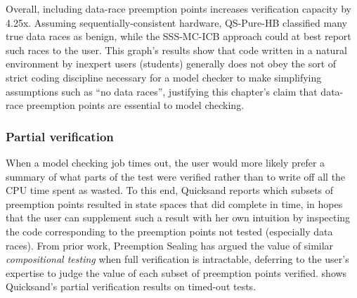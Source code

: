 Overall, including data-race preemption points increases verification capacity by 4.25x.
Assuming sequentially-consistent hardware,
QS-Pure-HB classified many true data races as benign,
while the SSS-MC-ICB approach could at best report such races to the user.
This graph's results show that code written in a natural environment by inexpert users (students)
generally does not obey the sort of strict coding discipline necessary
for a model checker to make simplifying assumptions such as ``no data races'',
justifying this chapter's claim that data-race preemption points are essential to model checking.

\subsubsection{Partial verification}
\label{sec:quicksand-eval-partial}

When a model checking job times out,
the user would more likely prefer a summary of what parts of the test were verified
rather than to write off all the CPU time spent as wasted.
To this end,
Quicksand
reports which subsets of preemption points resulted in state spaces that did complete in time,
in hopes that the user can supplement such a result with her own intuition
by inspecting the code corresponding to the preemption points not tested (especially data races).
From prior work, Preemption Sealing \cite{sealing}
has argued the value of similar {\em compositional testing} when full verification is intractable,
deferring to the user's expertise to judge the value of each subset of preemption points verified.
 shows Quicksand's partial verification results on timed-out tests.

